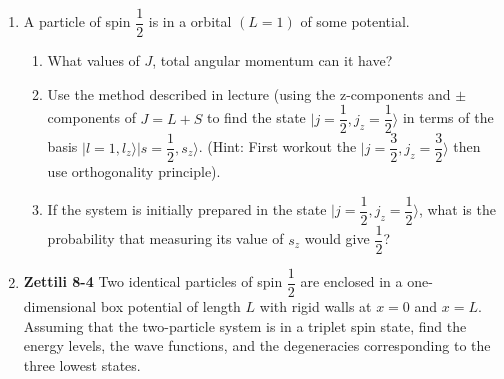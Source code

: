 \documentclass[fleqn]{article}
\begin{document}
  \begin{enumerate}
    \item A particle of spin $\dfrac{1}{2}$ is in a orbital $(L=1)$ of some potential.
    \begin{enumerate}
      \item What values of $J$, total angular momentum can it have?


      \item Use the method described in lecture (using the z-components and $\pm$ components of $J=L+S$ to find the state 
      $\vert j=\dfrac{1}{2}, j_z=\dfrac{1}{2} \rangle$ in terms of the basis $\vert l=1,l_z \rangle \vert s=\dfrac{1}{2}, s_z \rangle$.
      (Hint: First workout the $\vert j=\dfrac{3}{2}, j_z=\dfrac{3}{2} \rangle$ then use orthogonality principle).


      \item If the system is initially prepared in the state $\vert j=\dfrac{1}{2}, j_z=\dfrac{1}{2} \rangle$, what is the probability that
      measuring its value of $s_z$ would give $\dfrac{1}{2}$?
    \end{enumerate}

    \item \textbf{Zettili 8-4}
    Two identical particles of spin $\dfrac{1}{2}$ are enclosed in a one-dimensional box potential of length $L$ with rigid walls at 
    $x=0$ and $x=L$. Assuming that the two-particle system is in a triplet spin state, find the energy levels, the wave functions, and the degeneracies corresponding
    to the three lowest states.
    
  \end{enumerate}
\end{document}
